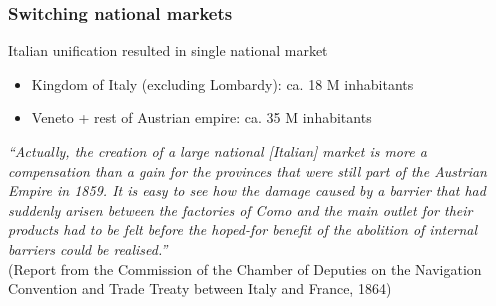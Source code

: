 \documentclass[10pt]{beamer}
\begin{document}
\begin{frame}
    \frametitle{Switching national markets}

Italian unification resulted in single national market
    \begin{itemize}
        \item Kingdom of Italy (excluding Lombardy): ca. 18 M inhabitants 
        \item Veneto + rest of Austrian empire: ca. 35 M inhabitants
    \end{itemize}

\bigskip 

   \textit{``Actually, the creation of a large national [Italian] market is more a compensation than a gain for the provinces that were still part of the Austrian Empire in 1859. It is easy to see how the damage caused by a barrier that had suddenly arisen between the factories of Como and the main outlet for their products had to be felt before the hoped-for benefit of the abolition of internal barriers could be realised.''} \\
   (Report from the Commission of the Chamber of Deputies on the Navigation Convention and Trade Treaty between Italy and France, 1864)

\end{frame}
\end{document}
